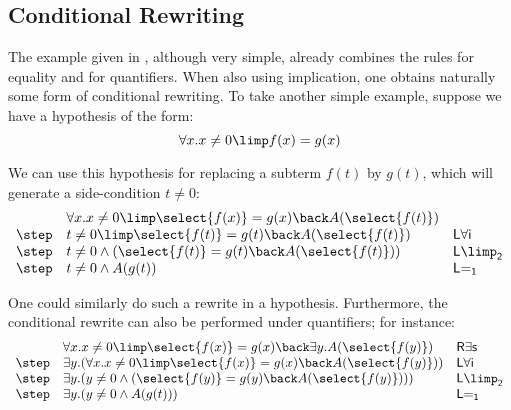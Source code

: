 \subsection{Conditional Rewriting}
The example given in , although very simple,
already combines the rules for equality and for quantifiers. When also
using implication, one obtains naturally some form of conditional
rewriting. To take another simple example, suppose we have a
hypothesis of the form:
$$\forall x. x\neq 0 \limp f(x) = g(x)$$

We can use this hypothesis for replacing a subterm $f(t)$ by $g(t)$,
which will generate a side-condition $t\neq 0$:
$$
\begin{array}{lll}
  &\forall x. x\neq 0 \limp \select{f(x)} = g(x) \back A(\select{f(t)}) &\\
  \step & t\neq 0 \limp \select{f(t)} = g(t) \back A(\select{f(t)}) &\mathsf{L \forall i}\\
  \step & t\neq 0 \land (\select{f(t)} = g(t) \back A(\select{f(t)})) & \mathsf{L{\limp}_2}\\
  \step &  t\neq 0 \land A(g(t)) &\mathsf{L{=}_1} \\
\end{array}$$

One could similarly do such a rewrite in a hypothesis. Furthermore,
the conditional rewrite can also be performed under quantifiers; for instance:
$$
\begin{array}{lll}
  &\forall x. x\neq 0 \limp \select{f(x)} = g(x) \back \exists y . A(\select{f(y)})
  &\mathsf{R \exists s}\\
  \step &\exists y. ( \forall x. x\neq 0 \limp \select{f(x)} = g(x) \back A(\select{f(y)})) &\mathsf{L \forall i}\\
  \step & \exists y. ( y\neq 0 \land ( \select{f(y)} = g(y) \back A(\select{f(y)}) )) &\mathsf{L{\limp}_2} \\
  \step & \exists y .( y\neq 0 \land A(g(t))) &\mathsf{L{=}_1} \\
\end{array}$$



